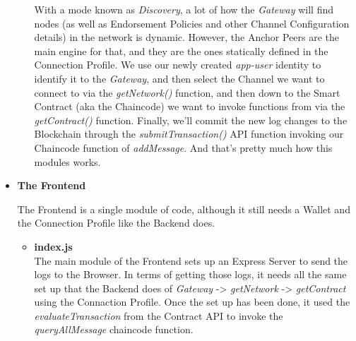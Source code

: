 \begin{itemize}
\begin{itemize}
							\hspace{10mm}With a mode known as \textit{Discovery}, a lot of how the \textit{Gateway} will find nodes (as well as Endorsement Policies and other Channel Configuration details) in the network is dynamic. However, the Anchor Peers are the main engine for that, and they are the ones statically defined in the Connection Profile. We use our newly created \textit{app-user} identity to identify it to the \textit{Gateway}, and then select the Channel we want to connect to via the \textit{getNetwork()} function, and then down to the Smart Contract (aka the Chaincode) we want to invoke functions from via the \textit{getContract()} function. Finally, we'll commit the new log changes to the Blockchain through the \textit{submitTransaction()} API function invoking our Chaincode function of \textit{addMessage}. And that's pretty much how this modules works.
						
					\end{itemize}
					
			\item \textbf{The Frontend}
				
					\hspace{10mm}The Frontend is a single module of code, although it still needs a Wallet and the Connection Profile like the Backend does.
					
					\begin{itemize}
					
						\item \textbf{index.js}\\
						
							\hspace{10mm}The main module of the Frontend sets up an Express Server to send the logs to the Browser. In terms of getting those logs, it needs all the same set up that the Backend does of \textit{Gateway} -> \textit{getNetwork} -> \textit{getContract} using the Connaction Profile. Once the set up has been done, it used the \textit{evaluateTransaction} from the Contract API to invoke the \textit{queryAllMessage} chaincode function.
					
					\end{itemize}
					
			\end{itemize}
							
						